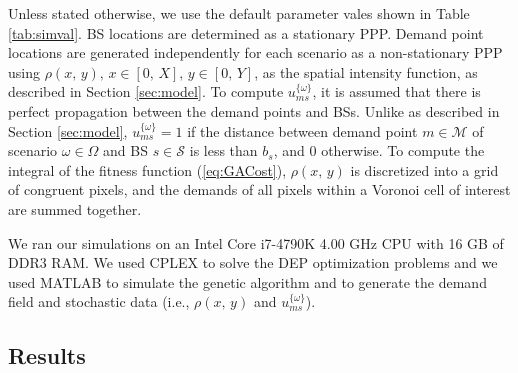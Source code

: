 \documentclass[onecolumn,draftcls]{IEEEtran}
\begin{document}
Unless stated otherwise, we use the default parameter vales shown in Table \ref{tab:simval}.  BS locations are determined as a stationary PPP.  Demand point locations are generated independently for each scenario as a non-stationary PPP using $\rho\left(x,\, y\right),\, x \in [0,\, X],\, y \in [0,\, Y]$, as the spatial intensity function, as described in Section \ref{sec:model}.  To compute $u_{ms}^{\{\omega\}}$, it is assumed that there is perfect propagation between the demand points and BSs.  Unlike as described in Section \ref{sec:model}, $u_{ms}^{\{\omega\}} = 1$ if the distance between demand point $m \in \mathcal{M}$ of scenario $\omega \in \Omega$ and BS $s \in \mathcal{S}$ is less than $b_s$, and 0 otherwise.  To compute the integral of the fitness function (\ref{eq:GACost}), $\rho\left(x,\, y\right)$ is discretized into a grid of congruent pixels, and the demands of all pixels within a Voronoi cell of interest are summed together.

We ran our simulations on an Intel Core i7-4790K 4.00 GHz CPU with 16 GB of DDR3 RAM.  We used CPLEX \iffalse\textcolor{blue}{\textit{(Mohammad provides a citation for what CPLEX is here, should I?)}}\fi to solve the DEP optimization problems and we used MATLAB \iffalse\textcolor{blue}{\textit{(then should I cite MATLAB here, as well?)}}\fi to simulate the genetic algorithm and to generate the demand field and stochastic data (i.e., $\rho\left(x,\, y\right)$ and $u_{ms}^{\{\omega\}}$).

\subsection{Results} \label{subsec:results}

\end{document}
